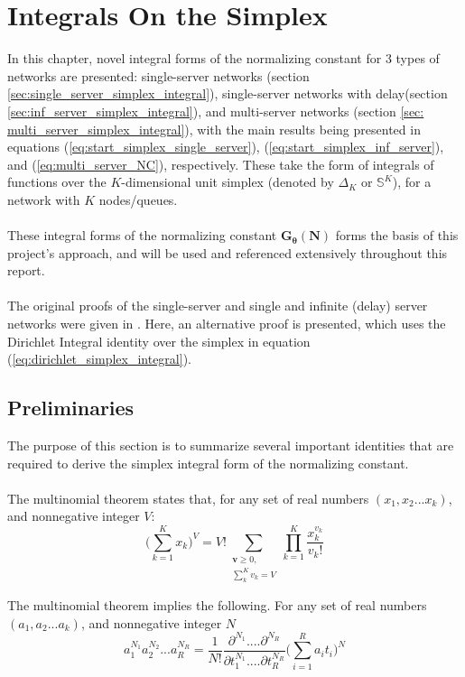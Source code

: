 \chapter{Integrals On the Simplex}\label{sec:Chapter3}

In this chapter, novel integral forms of the normalizing constant for 3 types of networks are presented: single-server networks (section \ref{sec:single_server_simplex_integral}), single-server networks with delay(section \ref{sec:inf_server_simplex_integral}), and multi-server networks (section \ref{sec: multi_server_simplex_integral}), with the main results being presented in equations (\ref{eq:start_simplex_single_server}), (\ref{eq:start_simplex_inf_server}), and (\ref{eq:multi_server_NC}), respectively. These take the form of integrals of functions over the \(K\)-dimensional unit simplex (denoted by \(\Delta_K\) or \(\mathbb{S}^K\)), for a network with \(K\) nodes/queues.
\\\\
These integral forms of the normalizing constant \(\mathbf{G}_{\boldsymbol{\theta}}(\mathbf{N})\) forms the basis of this project's approach, and will be used and referenced extensively throughout this report.
\\\\
The original proofs of the single-server and single and infinite (delay) server networks were given in \cite{Casale2017AcceleratingMethods}. Here, an alternative proof is presented, which uses the Dirichlet Integral identity over the simplex in equation (\ref{eq:dirichlet_simplex_integral}). 

\section{Preliminaries}

The purpose of this section is to summarize several important identities that are required to derive the simplex integral form of the normalizing constant.
\\\\
The multinomial theorem states that, for any set of real numbers \((x_1, x_2 ... x_k)\), and nonnegative integer \(V\):
\begin{equation}\label{eq:mt}
    \bigg( \sum_{k=1}^K x_k \bigg)^V = V! \sum_{\substack{\mathbf{v} \geq 0, \\ \sum_k^K v_k = V}}\prod_{k=1}^K \frac{x_k^{v_k}}{v_k!}
\end{equation}

\begin{theorem} \label{theorem:multinomial_2}
The multinomial theorem implies the following. For any set of real numbers \((a_1, a_2 ... a_k)\), and nonnegative integer \(N\)
    \begin{equation} \label{eq:multinomial_2}
        a_1^{N_1} a_2^{N_2} ... a_R^{N_R} = \frac{1}{N!} \frac{\partial^{N_1}....\partial^{N_R}}{\partial t_1^{N_1}....\partial t_R^{N_R}}\bigg( \sum_{i=1}^R a_i t_i \bigg)^N
    \end{equation}
\end{theorem}

